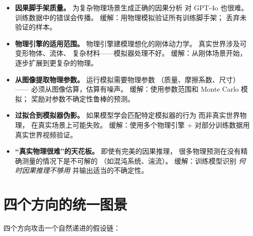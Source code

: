 \documentclass[12pt,a4paper]{article}
\begin{document}
\begin{riskbox}
\begin{itemize}[leftmargin=1.5em]
  \item \textbf{因果脚手架质量。}
    为复杂物理场景生成正确的因果分析
    对 GPT-4o 也很难。训练数据中的错误会传播。
    缓解：用物理模拟验证所有训练脚手架；
    丢弃未验证的样本。
  \item \textbf{物理引擎的适用范围。}
    物理引擎建模理想化的刚体动力学。
    真实世界涉及可变形物体、流体、
    复杂材料——模拟器处理不好。
    缓解：从刚体场景开始，
    逐步扩展到更复杂的物理。
  \item \textbf{从图像提取物理参数。}
    运行模拟需要物理参数
    （质量、摩擦系数、尺寸）——
    必须从图像估算，估算有噪声。
    缓解：使用参数范围和 Monte Carlo 模拟；
    奖励对参数不确定性鲁棒的预测。
  \item \textbf{过拟合到模拟器伪影。}
    如果模型学会匹配特定模拟器的行为
    而非真实世界物理，
    在真实场景上可能失败。
    缓解：使用多个物理引擎
    + 对部分训练数据用真实世界视频验证。
  \item \textbf{``真实物理很难''的天花板。}
    即使有完美的因果推理，
    很多物理预测在没有精确测量的情况下是不可解的
    （如混沌系统、湍流）。
    缓解：训练模型识别
    \textit{何时因果推理不够用}
    并输出适当的不确定性。
\end{itemize}
\end{riskbox}


\newpage
\section*{四个方向的统一图景}

四个方向攻击一个自然递进的假设链：
\end{document}
